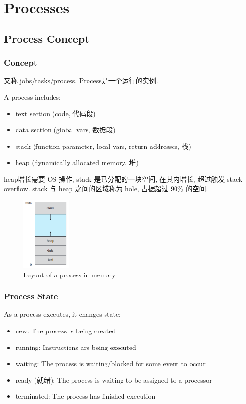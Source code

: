 \newpage
\section{Processes}
\subsection{Process Concept}
\subsubsection{Concept}
又称 jobs/tasks/process. Process是一个运行的实例. 

A process includes:
\begin{itemize}
    \item text section (code, 代码段)
    \item data section (global vars, 数据段)
    \item stack (function parameter, local vars, return addresses, 栈)
    \item heap (dynamically allocated memory, 堆)
\end{itemize}

heap增长需要 OS 操作, stack 是已分配的一块空间, 在其内增长, 超过触发 stack overflow. stack 与 heap 之间的区域称为 hole, 占据超过 90\% 的空间. 

\begin{figure}[!htb]
    \centering
    \includegraphics[width=0.22\textwidth]{pic/OS3/Layout of a process in memory.png}
    \caption{Layout of a process in memory}
\end{figure}

\subsubsection{Process State}
As a process executes, it changes state:
\begin{itemize}\small
    \item new: The process is being created
    \item running: Instructions are being executed
    \item waiting: The process is waiting/blocked for some event to occur
    \item ready (就绪): The process is waiting to be assigned to a processor
    \item terminated: The process has finished execution
\end{itemize}

